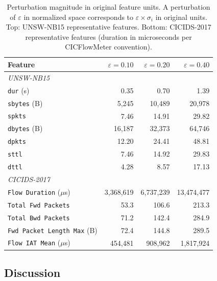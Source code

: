 \documentclass[sigconf,anonymous=true]{acmart}
\begin{document}
\begin{table}[t]
\centering
\caption{Perturbation magnitude in original feature units.
         A perturbation of $\varepsilon$ in normalized space corresponds
         to $\varepsilon \times \sigma_i$ in original units.
         Top: UNSW-NB15 representative features.
         Bottom: CICIDS-2017 representative features (duration in
         microseconds per CICFlowMeter convention).}
\label{tab:calibration}
\small
\begin{tabular}{l r r r}
\toprule
\textbf{Feature} & \textbf{$\varepsilon=0.10$} & \textbf{$\varepsilon=0.20$} &
  \textbf{$\varepsilon=0.40$} \\
\midrule
\multicolumn{4}{l}{\emph{UNSW-NB15}} \\
\texttt{dur} (s)    & 0.35 & 0.70 & 1.39 \\
\texttt{sbytes} (B) & 5,245 & 10,489 & 20,978 \\
\texttt{spkts}      & 7.46 & 14.91 & 29.82 \\
\texttt{dbytes} (B) & 16,187 & 32,373 & 64,746 \\
\texttt{dpkts}      & 12.20 & 24.41 & 48.81 \\
\texttt{sttl}       & 7.46 & 14.92 & 29.83 \\
\texttt{dttl}       & 4.28 & 8.57 & 17.13 \\
\midrule
\multicolumn{4}{l}{\emph{CICIDS-2017}} \\
\texttt{Flow Duration} ($\mu$s) & 3,368,619 & 6,737,239 & 13,474,477 \\
\texttt{Total Fwd Packets}      & 53.3 & 106.6 & 213.3 \\
\texttt{Total Bwd Packets}      & 71.2 & 142.4 & 284.9 \\
\texttt{Fwd Packet Length Max} (B) & 72.4 & 144.8 & 289.5 \\
\texttt{Flow IAT Mean} ($\mu$s) & 454,481 & 908,962 & 1,817,924 \\
\bottomrule
\end{tabular}
\end{table}

\subsection{Discussion}
\label{sec:discussion}
\end{document}
